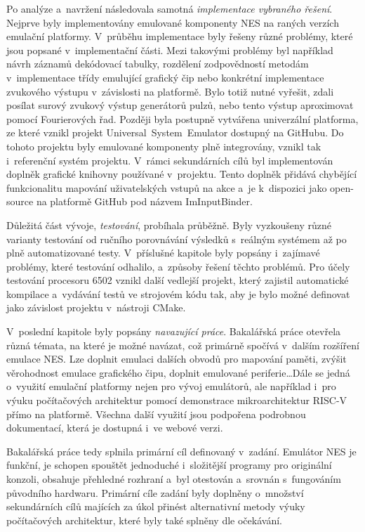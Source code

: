 Po analýze a~navržení následovala samotná \emph{implementace vybraného řešení}. Nejprve byly implementovány emulované komponenty NES na raných verzích emulační platformy. V~průběhu implementace byly řešeny různé problémy, které jsou popsané v~implementační části. Mezi takovými problémy byl například návrh záznamů dekódovací tabulky, rozdělení zodpovědností metodám v~implementace třídy emulující grafický čip nebo konkrétní implementace zvukového výstupu v~závislosti na platformě. Bylo totiž nutné vyřešit, zdali posílat surový zvukový výstup generátorů pulzů, nebo tento výstup aproximovat pomocí Fourierových řad. Později byla postupně vytvářena univerzální platforma, ze které vznikl projekt Universal~System~Emulator dostupný na GitHubu. Do tohoto projektu byly emulované komponenty plně integrovány, vznikl tak i~referenční systém projektu. V~rámci sekundárních cílů byl implementován doplněk grafické knihovny používané v~projektu. Tento doplněk přidává chybějící funkcionalitu mapování uživatelských vstupů na akce a~je k~dispozici jako open-source na platformě GitHub pod názvem ImInputBinder.

Důležitá část vývoje, \emph{testování}, probíhala průběžně. Byly vyzkoušeny různé varianty testování od ručního porovnávání výsledků s~reálným systémem až po plně automatizované testy. V~příslušné kapitole byly popsány i~zajímavé problémy, které testování odhalilo, a~způsoby řešení těchto problémů. Pro účely testování procesoru 6502 vznikl další vedlejší projekt, který zajistil automatické kompilace a~vydávání testů ve strojovém kódu tak, aby je bylo možné definovat jako závislost projektu v~nástroji CMake.

V~poslední kapitole byly popsány \emph{navazující práce}. Bakalářská práce otevřela různá témata, na které je možné navázat, což primárně spočívá v~dalším rozšíření emulace NES. Lze doplnit emulaci dalších obvodů pro mapování paměti, zvýšit věrohodnost emulace grafického čipu, doplnit emulované periferie\dots Dále se jedná o~využití emulační platformy nejen pro vývoj emulátorů, ale například i~pro výuku počítačových architektur pomocí demonstrace mikroarchitektur RISC-V přímo na platformě. Všechna další využití jsou podpořena podrobnou dokumentací, která je dostupná i~ve webové verzi.

Bakalářská práce tedy splnila primární cíl definovaný v~zadání. Emulátor NES je funkční, je schopen spouštět jednoduché i~složitější programy pro originální konzoli, obsahuje přehledné rozhraní a~byl otestován a~srovnán s~fungováním původního hardwaru. Primární cíle zadání byly doplněny o~množství sekundárních cílů majících za úkol přinést alternativní metody výuky počítačových architektur, které byly také splněny dle očekávání.